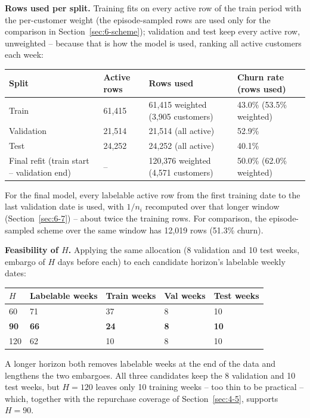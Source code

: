 \textbf{Rows used per split.} Training fits on every active row of the train period with the per-customer weight (the episode-sampled rows are used only for the comparison in Section~\ref{sec:6-scheme}); validation and test keep every active row, unweighted -- because that is how the model is used, ranking all active customers each week:

\begin{center}
\begin{tabular}{@{}p{3.4cm}p{2.6cm}p{4.2cm}p{2.3cm}@{}}
    \toprule
    Split & Active rows & Rows used & Churn rate (rows used) \\
    \midrule
    Train & 61,415 & 61,415 weighted (3,905 customers) & 43.0\% (53.5\% weighted) \\
    Validation & 21,514 & 21,514 (all active) & 52.9\% \\
    Test & 24,252 & 24,252 (all active) & 40.1\% \\
    Final refit (train start -- validation end) & -- & 120,376 weighted (4,571 customers) & 50.0\% (62.0\% weighted) \\
    \bottomrule
\end{tabular}
\end{center}

For the final model, every labelable active row from the first training date to the last validation date is used, with $1/n_i$ recomputed over that longer window (Section~\ref{sec:6-7}) -- about twice the training rows. For comparison, the episode-sampled scheme over the same window has 12,019 rows (51.3\% churn).

\textbf{Feasibility of $H$.} Applying the same allocation (8 validation and 10 test weeks, embargo of $H$ days before each) to each candidate horizon's labelable weekly dates:

\begin{center}
\begin{tabular}{@{}p{1.8cm}p{2.6cm}p{2.3cm}p{2.1cm}p{2.1cm}@{}}
    \toprule
    $H$ & Labelable weeks & Train weeks & Val weeks & Test weeks \\
    \midrule
    60 & 71 & 37 & 8 & 10 \\
    \textbf{90} & \textbf{66} & \textbf{24} & \textbf{8} & \textbf{10} \\
    120 & 62 & 10 & 8 & 10 \\
    \bottomrule
\end{tabular}
\end{center}

A longer horizon both removes labelable weeks at the end of the data and lengthens the two embargoes. All three candidates keep the 8 validation and 10 test weeks, but $H = 120$ leaves only 10 training weeks -- too thin to be practical -- which, together with the repurchase coverage of Section~\ref{sec:4-5}, supports $H = 90$.

